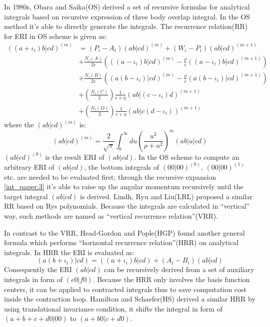 In 1980s, Obara and Saika(OS)\cite{OS1986,OS1988} derived a set of
recursive formulas for analytical integrals based on recursive expression of 
three body overlap integral. In the OS method it's able to directly generate the integrals. The 
recurrence relation(RR) for ERI in OS scheme is given as:
\begin{equation}
 \begin{split}
((a+\iota_{i})b|cd)^{(m)} &= (P_{i} - A_{i})(ab|cd)^{(m)} +
\left(W_{i} -P_{i}\right)(ab|cd)^{(m+1)} \\
&+\frac{N_{i}(A)}{2\epsilon}\left(((a-\iota_{i})b|cd)^{(m)}-\frac{\rho}{
\epsilon }((a-\iota_{i})b|cd)^{(m+1)}\right)  \\
&+\frac{N_{i}(B)}{2\epsilon}\left((a(b-\iota_{i})|cd)^{(m)}-\frac{\rho}{
\epsilon }(a(b-\iota_{i})|cd)^{(m+1)}\right)  \\
&+\left(\frac{N_{i}(C)}{2}\right)\frac{1}{\epsilon+\eta}
(ab|(c-\iota_{i})d)^{(m+1)} \\
&+\left(\frac{N_{i}(D)}{2}\right)\frac{1}{\epsilon+\eta}
(ab|c(d-\iota_{i}))^{(m+1)}
\end{split}
\label{int_paper:3}
\end{equation}
where the $(ab|cd)^{(m)}$ is:
\begin{equation}
\label{int_paper:4}
 (ab|cd)^{(m)} = \frac{2}{\sqrt{\pi}}\int^{\infty}_{0} du \left( \frac{u^{2}}
{\rho+u^{2}}\right)^{m}(ab|u|cd) 
\end{equation}
$(ab|cd)^{(0)}$ is the result ERI of $(ab|cd)$. In the OS scheme to compute an arbitrary ERI 
of $(ab|cd)$, the bottom integrals of $(00|00)^{(0)}$, $(00|00)^{(1)}$ etc. are needed 
to be evaluated first; through the recursive expansion \ref{int_paper:3} it's able to raise
up the angular momentum recursively until the target integral $(ab|cd)$ is derived. Lindh, 
Ryu and Liu\cite{lindh1991reduced}(LRL) proposed a similar RR based on Rys 
polynomials. Because the integrals are calculated in ``vertical'' way, 
such methods are named as ``vertical recurrence relation''(VRR).

In contrast to the VRR, Head-Gordon and Pople(HGP)\cite{HGP} found another general formula which 
performs ``horizontal recurrence relation''(HRR) on analytical integrals. In HRR the ERI
is evaluated as:
\begin{equation}
\label{int_paper:5}
 (a(b+\iota_{i})|cd) = ((a+\iota_{i})b|cd) + 
(A_{i} - B_{i})(ab|cd)
\end{equation}
Consequently the ERI $(ab|cd)$ can be recursively derived from a set of auxiliary integrals
in form of $(e0|f0)$. Because the HRR only involves the basis function centers,
it can be applied to contracted integrals thus to save computation cost 
inside the contraction loop. Hamilton and Schaefer\cite{new_hrr_Schaefer}(HS) derived a 
similar HRR by using translational invariance condition, it shifts the integral in form of 
$(a+b+c+d0|00)$ to $(a+b0|c+d0)$. 

